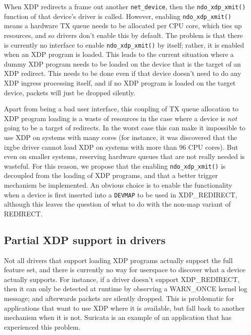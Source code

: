 \documentclass[sigconf]{acmart}
\begin{document}
When XDP redirects a frame out another \texttt{net\_device}, then the
\texttt{ndo\_xdp\_xmit()} function of that device's driver is called. However,
enabling \texttt{ndo\_xdp\_xmit()} means a hardware TX queue needs to be
allocated per CPU core, which ties up resources, and so drivers don't enable
this by default. The problem is that there is currently no interface to enable
\texttt{ndo\_xdp\_xmit()} by itself; rather, it is enabled when an XDP program
is loaded. This leads to the current situation where a dummy XDP program needs
to be loaded on the device that is the target of an XDP redirect. This needs to
be done even if that device doesn't need to do any XDP ingress processing
itself, and if no XDP program is loaded on the target device, packets will just
be dropped silently.

Apart from being a bad user interface, this coupling of TX queue allocation to
XDP program loading is a waste of resources in the case where a device is
\emph{not} going to be a target of redirects. In the worst case this can make it
impossible to use XDP on systems with many cores (for instance, it was
discovered that the ixgbe driver cannot load XDP on systems with more than 96
CPU cores). But even on smaller systems, reserving hardware queues that are not
really needed is wasteful. For this reason, we propose that the enabling
\texttt{ndo\_xdp\_xmit()} is decoupled from the loading of XDP programs, and
that a better trigger mechanism be implemented. An obvious choice is to enable
the functionality when a device is first inserted into a \texttt{DEVMAP} to be
used in XDP\_REDIRECT, although this leaves the question of what to do with the
non-map variant of REDIRECT.

\subsection{Partial XDP support in drivers}
\label{sec:partial-xdp-support}

Not all drivers that support loading XDP programs actually support the full
feature set, and there is currently no way for userspace to discover what a
device actually supports. For instance, if a driver doesn't support
XDP\_REDIRECT, then it can only be detected at runtime by observing a WARN\_ONCE
kernel log message; and afterwards packets are silently dropped. This is
problematic for applications that want to use XDP where it is available, but
fall back to another mechanism when it is not. Suricata is an example of an
application that has experienced this problem.
\end{document}
